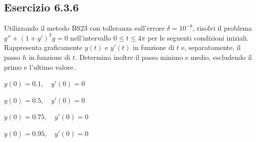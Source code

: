 \documentclass[letterpaper, 12pt]{article}
\numberwithin{equation}{section}    %
\begin{document}
\subsection{Esercizio 6.3.6}
Utilizzando il metodo BS23 con tolleranza sull'errore $\delta=10^{-8}$, risolvi il problema 
$y'' +(1+y')^3 y = 0$ nell'intervallo $0 \le t \le 4\pi$ per le seguenti condizioni iniziali. 
Rappresenta graficamente $y(t)$ e $y'(t)$ in funzione di $t$ e, separatamente, il passo $h$ in funzione di $t$. 
Determina inoltre il passo minimo e medio, escludendo il primo e l'ultimo valore.
\begin{itemize}
    \begin{minipage}[t]{0.45\textwidth}
        \item $y(0) = 0.1,\quad y'(0) = 0$
    \end{minipage}
    \hfill
    \begin{minipage}[t]{0.45\textwidth}
        \item $y(0) = 0.5,\quad y'(0) = 0$
    \end{minipage}
    \begin{minipage}[t]{0.45\textwidth}
        \item $y(0) = 0.75,\quad y'(0) = 0$
    \end{minipage}
    \hfill
    \begin{minipage}[t]{0.45\textwidth}
        \item $y(0) = 0.95,\quad y'(0) = 0$
    \end{minipage}
\end{itemize}
\end{document}
